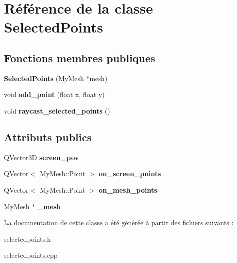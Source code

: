\hypertarget{classSelectedPoints}{}\section{Référence de la classe Selected\+Points}
\label{classSelectedPoints}
\subsection*{Fonctions membres publiques}
\begin{DoxyCompactItemize}
\item 
\mbox{\label{classSelectedPoints_af097cb4c0d86af85ad30ed5da0dc8df0}} 
{\bfseries Selected\+Points} (My\+Mesh $\ast$mesh)
\item 
\mbox{\label{classSelectedPoints_a6386db973e12b8477616d52f9dfbca6d}} 
void {\bfseries add\+\_\+point} (float x, float y)
\item 
\mbox{\label{classSelectedPoints_a4bfe85abce5fef197ddd8d642980f38e}} 
void {\bfseries raycast\+\_\+selected\+\_\+points} ()
\end{DoxyCompactItemize}
\subsection*{Attributs publics}
\begin{DoxyCompactItemize}
\item 
\mbox{\label{classSelectedPoints_a9a744ff609c0eb1d94bd1af0a1fec099}} 
Q\+Vector3D {\bfseries screen\+\_\+pov}
\item 
\mbox{\label{classSelectedPoints_a6e7e9a96e74ae0a98517715ae03fc2b6}} 
Q\+Vector$<$ My\+Mesh\+::\+Point $>$ {\bfseries on\+\_\+screen\+\_\+points}
\item 
\mbox{\label{classSelectedPoints_ade2b627362db8b9ce9e5c4078b6dbd64}} 
Q\+Vector$<$ My\+Mesh\+::\+Point $>$ {\bfseries on\+\_\+mesh\+\_\+points}
\item 
\mbox{\label{classSelectedPoints_af2a4ba26fc94d6b8374ea93260621473}} 
My\+Mesh $\ast$ {\bfseries \+\_\+mesh}
\end{DoxyCompactItemize}


La documentation de cette classe a été générée à partir des fichiers suivants \+:\begin{DoxyCompactItemize}
\item 
selectedpoints.\+h\item 
selectedpoints.\+cpp\end{DoxyCompactItemize}
